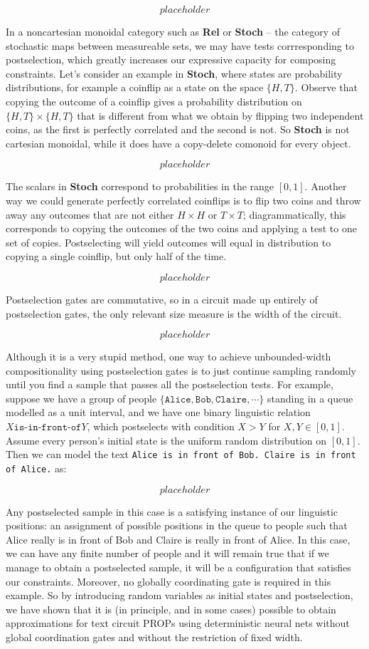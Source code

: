 \[placeholder\]

In a noncartesian monoidal category such as \textbf{Rel} or \textbf{Stoch} -- the category of stochastic maps between measureable sets, we may have tests corrresponding to postselection, which greatly increases our expressive capacity for composing constraints. Let's consider an example in \textbf{Stoch}, where states are probability distributions, for example a coinflip as a state on the space $\{H,T\}$. Observe that copying the outcome of a coinflip gives a probability distribution on $\{H,T\} \times \{H,T\}$ that is different from what we obtain by flipping two independent coins, as the first is perfectly correlated and the second is not. So \textbf{Stoch} is not cartesian monoidal, while it does have a copy-delete comonoid for every object.

\[placeholder\]

The scalars in \textbf{Stoch} correspond to probabilities in the range $[0,1]$. Another way we could generate perfectly correlated coinflips is to flip two coins and throw away any outcomes that are not either $H \times H$ or $T \times T$; diagrammatically, this corresponds to copying the outcomes of the two coins and applying a test to one set of copies. Postselecting will yield outcomes will equal in distribution to copying a single coinflip, but only half of the time.

\[placeholder\]

Postselection gates are commutative, so in a circuit made up entirely of postselection gates, the only relevant size measure is the width of the circuit.

\[placeholder\]

Although it is a very stupid method, one way to achieve unbounded-width compositionality using postselection gates is to just continue sampling randomly until you find a sample that passes all the postselection tests. For example, suppose we have a group of people $\{\texttt{Alice}, \texttt{Bob}, \texttt{Claire}, \cdots\}$ standing in a queue modelled as a unit interval, and we have one binary linguistic relation $X \texttt{is-in-front-of} Y$, which postselects with condition $X > Y$ for $X,Y \in [0,1]$. Assume every person's initial state is the uniform random distribution on $[0,1]$. Then we can model the text \texttt{Alice is in front of Bob. Claire is in front of Alice.} as:

\[placeholder\]

Any postselected sample in this case is a satisfying instance of our linguistic positions: an assignment of possible positions in the queue to people such that Alice really is in front of Bob and Claire is really in front of Alice. In this case, we can have any finite number of people and it will remain true that if we manage to obtain a postselected sample, it will be a configuration that satisfies our constraints. Moreover, no globally coordinating gate is required in this example. So by introducing random variables as initial states and postselection, we have shown that it is (in principle, and in some cases) possible to obtain approximations for text circuit PROPs using deterministic neural nets without global coordination gates and without the restriction of fixed width.

